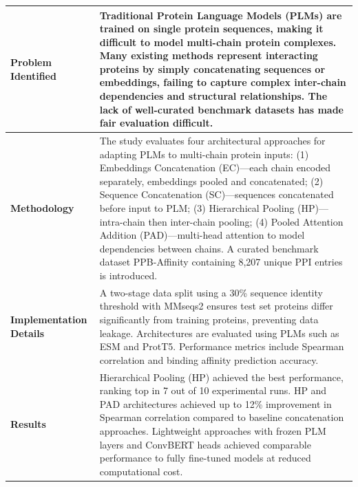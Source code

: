 \documentclass[12pt,a4paper]{report}
\begin{document}
\begin{table}[H]
\centering
\renewcommand{\arraystretch}{1.5}
\begin{tabular}{|p{}|p{}|}
\hline
\textbf{Problem Identified} & Traditional Protein Language Models (PLMs) are trained on single protein sequences, making it difficult to model multi-chain protein complexes. Many existing methods represent interacting proteins by simply concatenating sequences or embeddings, failing to capture complex inter-chain dependencies and structural relationships. The lack of well-curated benchmark datasets has made fair evaluation difficult. \\ \hline
\textbf{Methodology} & The study evaluates four architectural approaches for adapting PLMs to multi-chain protein inputs: (1) Embeddings Concatenation (EC)---each chain encoded separately, embeddings pooled and concatenated; (2) Sequence Concatenation (SC)---sequences concatenated before input to PLM; (3) Hierarchical Pooling (HP)---intra-chain then inter-chain pooling; (4) Pooled Attention Addition (PAD)---multi-head attention to model dependencies between chains. A curated benchmark dataset PPB-Affinity containing 8,207 unique PPI entries is introduced. \\ \hline
\textbf{Implementation Details} & A two-stage data split using a 30\% sequence identity threshold with MMseqs2 ensures test set proteins differ significantly from training proteins, preventing data leakage. Architectures are evaluated using PLMs such as ESM and ProtT5. Performance metrics include Spearman correlation and binding affinity prediction accuracy. \\ \hline
\textbf{Results} & Hierarchical Pooling (HP) achieved the best performance, ranking top in 7 out of 10 experimental runs. HP and PAD architectures achieved up to 12\% improvement in Spearman correlation compared to baseline concatenation approaches. Lightweight approaches with frozen PLM layers and ConvBERT heads achieved comparable performance to fully fine-tuned models at reduced computational cost. \\ \hline
\end{tabular}
\end{table}

\newpage
\end{document}
